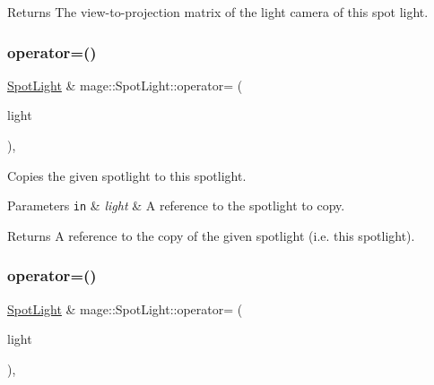 \begin{DoxyReturn}{Returns}
The view-\/to-\/projection matrix of the light camera of this spot light. 
\end{DoxyReturn}
\hypertarget{classmage_1_1_spot_light_a5923f3d1ec5061965af8094e1e1d3855}{}\label{classmage_1_1_spot_light_a5923f3d1ec5061965af8094e1e1d3855} 
\subsubsection{\texorpdfstring{operator=()}{operator=()}\hspace{0.1cm}{\footnotesize\ttfamily [1/2]}}
{\footnotesize\ttfamily \hyperlink{classmage_1_1_spot_light}{Spot\+Light} \& mage\+::\+Spot\+Light\+::operator= (\begin{DoxyParamCaption}\item[{const \hyperlink{classmage_1_1_spot_light}{Spot\+Light} \&}]{light }\end{DoxyParamCaption})\hspace{0.3cm}{\ttfamily [default]}, {\ttfamily [noexcept]}}

Copies the given spotlight to this spotlight.


\begin{DoxyParams}[1]{Parameters}
\mbox{\tt in}  & {\em light} & A reference to the spotlight to copy. \\
\hline
\end{DoxyParams}
\begin{DoxyReturn}{Returns}
A reference to the copy of the given spotlight (i.\+e. this spotlight). 
\end{DoxyReturn}
\hypertarget{classmage_1_1_spot_light_a4a618538ddc977e4c81be098b35ed2ac}{}\label{classmage_1_1_spot_light_a4a618538ddc977e4c81be098b35ed2ac} 
\subsubsection{\texorpdfstring{operator=()}{operator=()}\hspace{0.1cm}{\footnotesize\ttfamily [2/2]}}
{\footnotesize\ttfamily \hyperlink{classmage_1_1_spot_light}{Spot\+Light} \& mage\+::\+Spot\+Light\+::operator= (\begin{DoxyParamCaption}\item[{\hyperlink{classmage_1_1_spot_light}{Spot\+Light} \&\&}]{light }\end{DoxyParamCaption})\hspace{0.3cm}{\ttfamily [default]}, {\ttfamily [noexcept]}}

